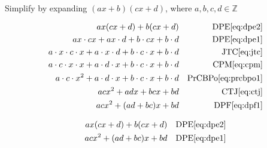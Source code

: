 \documentclass[20150903-160354-rs2.2-MarksMathNotebook.tex]{subfiles}
\begin{document}
\begin{example}[id:20141109-141347] \label{20141109-141347}  \hfill \\

Simplify by expanding  $(ax+b)(cx+d)$, where $a, b, c, d \in \mathbb{Z}$

\soln

\solnsteps
\begin{align*}
ax(cx+d)+b(cx+d)  && \text{DPE} \eqref{eq:dpe2} \\
ax \cdot cx + ax \cdot d + b \cdot cx + b \cdot d && \text{DPE} \eqref{eq:dpe1} \\
a \cdot x \cdot c \cdot x + a \cdot x \cdot d + b \cdot c \cdot x + b \cdot d   && \text{JTC} \eqref{eq:jtc} \\
a \cdot c \cdot x \cdot x + a \cdot d \cdot x + b \cdot c \cdot x + b \cdot d  && \text{CPM} \eqref{eq:cpm} \\
a \cdot c \cdot x^2 + a \cdot d \cdot x + b \cdot c \cdot x + b \cdot d  && \text{PrCBPo} \eqref{eq:prcbpo1} \\
acx^2 + adx + bcx + bd  && \text{CTJ} \eqref{eq:ctj} \\
acx^2 + (ad+bc)x + bd  && \text{DPF} \eqref{eq:dpf1}
\end{align*}

\soln

\lesssteps
\begin{align*}
ax(cx+d)+b(cx+d) && \text{DPE} \eqref{eq:dpe2} \\
acx^2 + (ad+bc)x + bd && \text{DPE} \eqref{eq:dpe1}
\end{align*}

\end{example}
\end{document}
